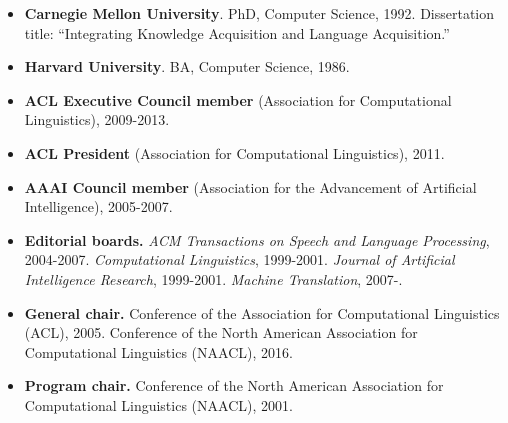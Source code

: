 \begin{itemize}
\item {\bf Carnegie Mellon University}.  PhD, Computer Science, 1992.
Dissertation title: ``Integrating Knowledge Acquisition and Language Acquisition.''

\item {\bf Harvard University}.  BA, Computer Science, 1986.

\end{itemize}



\begin{itemize}

\item {\bf ACL Executive Council member} (Association for Computational
Linguistics), 2009-2013.

\item {\bf ACL President} (Association for Computational Linguistics), 2011.

\item {\bf AAAI Council member} (Association for the Advancement of
Artificial Intelligence), 2005-2007.

\item {\bf Editorial boards.}  
 {\em ACM Transactions on Speech and Language Processing}, 2004-2007.
 {\em Computational Linguistics}, 1999-2001.
 {\em Journal of Artificial Intelligence Research}, 1999-2001.
 {\em Machine Translation}, 2007-.

\item {\bf General chair.}  Conference of the Association
for Computational Linguistics (ACL), 2005.
Conference of the North American Association
for Computational Linguistics (NAACL), 2016.

\item {\bf Program chair.}  Conference of the North American Association
for Computational Linguistics (NAACL), 2001.



\end{itemize}
